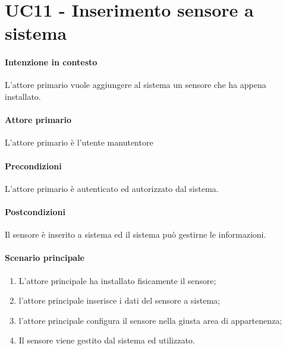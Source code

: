 \section{UC11 - Inserimento sensore a sistema}\label{uc:11}

\paragraph{Intenzione in contesto} L'attore primario vuole aggiungere al sistema un sensore che ha appena installato.

\paragraph{Attore primario} L'attore primario è l'utente manutentore

\paragraph{Precondizioni} L'attore primario è autenticato ed autorizzato dal sistema.

\paragraph{Postcondizioni} Il sensore è inserito a sistema ed il sistema può gestirne le informazioni.

\paragraph{Scenario principale}

\begin{enumerate}
    \item L'attore principale ha installato fisicamente il sensore;
    \item l'attore principale inserisce i dati del sensore a sistema;
    \item l'attore principale configura il sensore nella giusta area di appartenenza;
    \item Il sensore viene gestito dal sistema ed utilizzato.
\end{enumerate}
